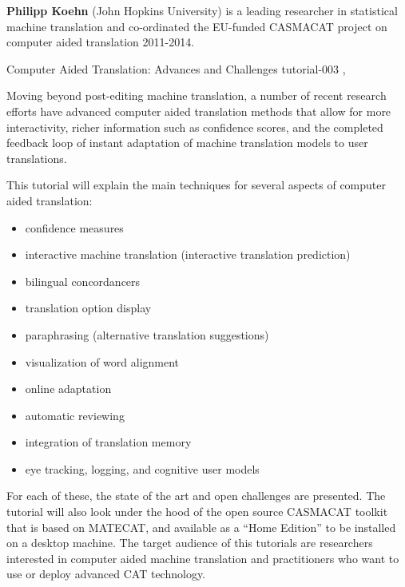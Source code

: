 \begin{bio}
{\bfseries Philipp Koehn} (John Hopkins University) is a leading researcher in statistical machine translation and co-ordinated the EU-funded CASMACAT project on computer aided translation 2011-2014.
\end{bio}

\begin{tutorial}
  {Computer Aided Translation: Advances and Challenges}
  {tutorial-003}
  {\daydateyear, \tutorialmorningtime}
  {\TutLocC}

Moving beyond post-editing machine translation, a number of recent research efforts have advanced computer aided translation methods that allow for more interactivity, richer information such as confidence scores, and the completed feedback loop of instant adaptation of machine translation models to user translations. 

This tutorial will explain the main techniques for several aspects of computer aided translation: 

\begin{itemize}
  \item confidence measures
  \item interactive machine translation (interactive translation prediction)
  \item bilingual concordancers
  \item translation option display
  \item paraphrasing (alternative translation suggestions)
  \item visualization of word alignment
  \item online adaptation
  \item automatic reviewing
  \item integration of translation memory
  \item eye tracking, logging, and cognitive user models
\end{itemize}

For each of these, the state of the art and open challenges are presented. The tutorial will also look under the hood of the open source CASMACAT toolkit that is based on MATECAT, and available as a ``Home Edition'' to be installed on a desktop machine. The target audience of this tutorials are researchers interested in computer aided machine translation and practitioners who want to use or deploy advanced CAT technology. 

\end{tutorial}
